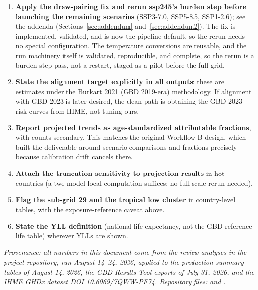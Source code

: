 \documentclass[11pt]{ozreport}
\begin{document}
\begin{enumerate}
\item \textbf{Apply the draw-pairing fix and rerun ssp245's burden step
  before launching the remaining scenarios} (SSP3-7.0, SSP5-8.5,
  SSP1-2.6); see the addenda (Sections~\ref{sec:addendum}
  and~\ref{sec:addendum2}). The fix is implemented, validated, and is now
  the pipeline default, so the rerun needs no special configuration. The
  temperature conversions are reusable, and the run machinery itself is
  validated, reproducible, and complete, so the rerun is a burden-step
  pass, not a restart, staged as a pilot before the full grid.
\item \textbf{State the alignment target explicitly in all outputs}: these
  are estimates under the Burkart 2021 (GBD 2019-era) methodology. If
  alignment with GBD 2023 is later desired, the clean path is
  obtaining the GBD 2023 risk curves from IHME, not tuning ours.
\item \textbf{Report projected trends as age-standardized attributable
  fractions}, with counts secondary. This matches the original Workflow-B
  design, which built the deliverable around scenario comparisons and
  fractions precisely because calibration drift cancels there.
\item \textbf{Attach the truncation sensitivity to projection results} in
  hot countries (a two-model local computation suffices; no full-scale
  rerun needed).
\item \textbf{Flag the sub-grid 29 and the tropical low cluster} in
  country-level tables, with the exposure-reference caveat above.
\item \textbf{State the YLL definition} (national life expectancy, not the
  GBD reference life table) wherever YLLs are shown.
\end{enumerate}

\medskip
{\raggedright
\noindent\textit{Provenance: all numbers in this document come from the
review analyses in the project repository, run August 14--24, 2026,
applied to the production summary tables of August 14, 2026, the GBD
Results Tool exports of July 31, 2026, and the IHME GHDx dataset DOI
10.6069/7QWW-PF74. Repository files:}
 \textit{and}
\textit{.}
\par}
\end{document}
